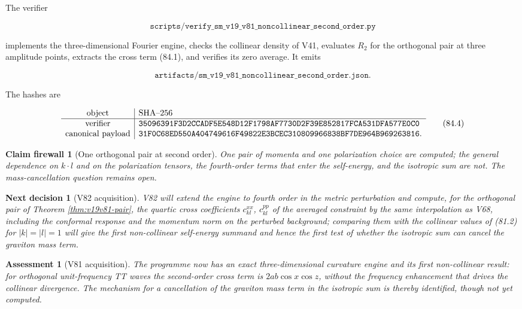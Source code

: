 \documentclass[11pt]{article}
\newtheorem{firewall}[theorem]{Claim firewall}
\newtheorem{decision}[theorem]{Next decision}
\newtheorem{assessment}[theorem]{Assessment}
\theoremstyle{remark}
\begin{document}
The verifier

\[
 \texttt{scripts/verify\_sm\_v19\_v81\_noncollinear\_second\_order.py}
                                                                    \tag{84.2}
\]

implements the three-dimensional Fourier engine, checks the collinear
density of V41, evaluates \(R_2\) for the orthogonal pair at three
amplitude points, extracts the cross term (84.1), and verifies its
zero average.  It emits

\[
 \texttt{artifacts/sm\_v19\_v81\_noncollinear\_second\_order.json}.  \tag{84.3}
\]

The hashes are

\[
\begin{array}{c|l}
\hbox{object}&\hbox{SHA--256}\\ \hline
\hbox{verifier}&
\texttt{35096391F3D2CCADF5E548D12F1798AF7730D2F39E852817FCA531DFA577E0C0}\\
\hbox{canonical payload}&
\texttt{31F0C68ED550A404749616F49822E3BCEC310809966838BF7DE964B969263816}.
\end{array}                                                     \tag{84.4}
\]

\begin{firewall}[One orthogonal pair at second order]
\label{fire:v19v81}
One pair of momenta and one polarization choice are computed; the
general dependence on \(k\cdot l\) and on the polarization tensors,
the fourth-order terms that enter the self-energy, and the isotropic
sum are not.  The mass-cancellation question remains open.
\end{firewall}

\begin{decision}[V82 acquisition]
\label{dec:v19v81-next}
V82 will extend the engine to fourth order in the metric perturbation
and compute, for the orthogonal pair of Theorem
\ref{thm:v19v81-pair}, the quartic cross coefficients
\(c^{xx}_{kl}\), \(c^{pp}_{kl}\) of the averaged constraint by the same
interpolation as V68, including the conformal response and the
momentum norm on the perturbed background; comparing them with the
collinear values of (81.2) for \(|k|=|l|=1\) will give the first
non-collinear self-energy summand and hence the first test of whether
the isotropic sum can cancel the graviton mass term.
\end{decision}

\begin{assessment}[V81 acquisition]
\label{ass:v19v81}
The programme now has an exact three-dimensional curvature engine and
its first non-collinear result: for orthogonal unit-frequency TT waves
the second-order cross term is \(2ab\cos x\cos z\), without the
frequency enhancement that drives the collinear divergence.  The
mechanism for a cancellation of the graviton mass term in the isotropic
sum is thereby identified, though not yet computed.
\end{assessment}
\end{document}
